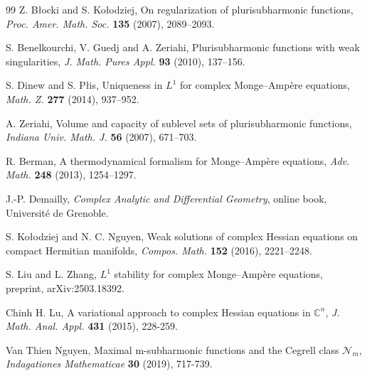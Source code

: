 \documentclass[11pt,reqno]{amsart}
\theoremstyle{definition}
\theoremstyle{remark}
\begin{document}
\begin{thebibliography}{99}
		Z. B{\l}ocki and S. Ko{\l}odziej,
		On regularization of plurisubharmonic functions,
		\emph{Proc. Amer. Math. Soc.} \textbf{135} (2007), 2089--2093.
		
		S. Benelkourchi, V. Guedj and A. Zeriahi,
		Plurisubharmonic functions with weak singularities,
		\emph{J. Math. Pures Appl.} \textbf{93} (2010), 137--156.
		
		S. Dinew and S. P{\l}is,
		Uniqueness in $L^1$ for complex Monge--Amp\`ere equations,
		\emph{Math. Z.} \textbf{277} (2014), 937--952.
		
		A. Zeriahi,
		Volume and capacity of sublevel sets of plurisubharmonic functions,
		\emph{Indiana Univ. Math. J.} \textbf{56} (2007), 671--703.
		
		R. Berman,
		A thermodynamical formalism for Monge--Amp\`ere equations,
		\emph{Adv. Math.} \textbf{248} (2013), 1254--1297.
		
		J.-P. Demailly,
		\emph{Complex Analytic and Differential Geometry},
		online book, Universit\'e de Grenoble.
		
		S. Ko{\l}odziej and N. C. Nguyen, Weak solutions of complex Hessian equations on
		compact Hermitian manifolds,   
		\emph{Compos. Math.} \textbf{152} (2016), 2221–2248.
		
		S. Liu and L. Zhang,
		$L^1$ stability for complex Monge--Amp\`ere equations,
		preprint, arXiv:2503.18392.
		
		Chinh H. Lu, A variational approach to complex Hessian equations in $\mathbb{C}^n$, 
		\emph{J. Math. Anal. Appl.} \textbf{431} (2015), 228-259.
		
		Van Thien Nguyen,
		Maximal m-subharmonic functions and the Cegrell class $\mathcal{N}_m$, \emph{Indagationes Mathematicae} \textbf{30} (2019), 717-739.
		
		
		
		
		
	\end{thebibliography}
	
	
	
	
	
	
\end{document}
